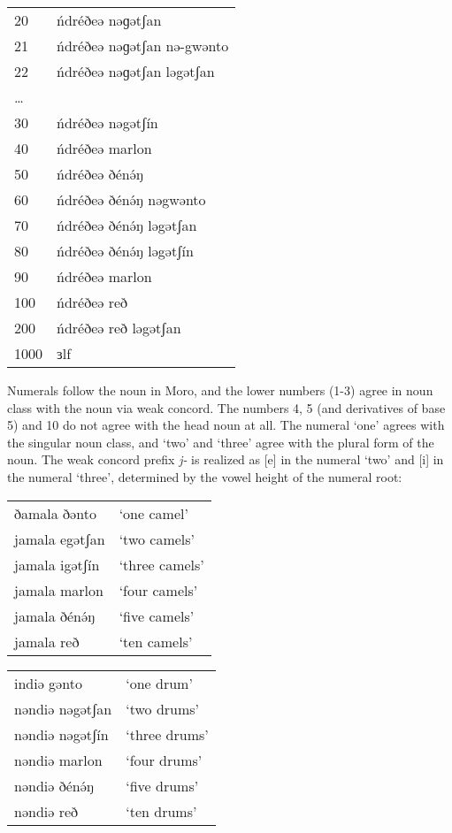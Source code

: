 \ea \begin{tabular}[t]{ll}
20	&ńdréðeə nəɡətʃan                  \\
21	&ńdréðeə nəɡətʃan nə-gwənto \\
22	& ńdréðeə nəɡətʃan ləgətʃan\\
{\ldots} & \\
30	&ńdréðeə nəgətʃín \\
40	&ńdréðeə marlon \\
50	&ńdréðeə ðénə́ŋ \\
60	&ńdréðeə ðénə́ŋ nəgwənto  \\
70	&ńdréðeə ðénə́ŋ ləgətʃan \\
80	&ńdréðeə ðénə́ŋ ləgətʃín  \\
90	&ńdréðeə marlon \\
100	&ńdréðeə reð   \\
200	&ńdréðeə reð ləgətʃan   \\
1000 & 	ɜlf \\
    \end{tabular}
\z

Numerals follow the noun in Moro, and the lower numbers (1-3) agree in noun class with the noun via weak concord. The numbers 4, 5 (and derivatives of base 5) and 10 do not agree with the head noun at all. The numeral ‘one’ agrees with the singular noun class, and ‘two’ and ‘three’ agree with the plural form of the noun. The weak concord prefix \textit{j-} is realized as [e] in the numeral ‘two’ and [i] in the numeral ‘three’, determined by the vowel height of the numeral root: 

\ea \ea \begin{tabular}[t]{ll}
ðamala ðənto	&	‘one camel’\\
jamala egətʃan	&	‘two camels’\\
jamala igətʃín	&	‘three camels’\\
jamala marlon	&	‘four camels’\\
jamala ðénə́ŋ	&	‘five camels’\\
jamala reð 		&	‘ten camels’ \\
\end{tabular}
	\ex \begin{tabular}[t]{ll}
indiə gənto		&	‘one drum’	\\
nəndiə nəgətʃan	&	‘two drums’\\
nəndiə nəgətʃín	&	‘three drums’\\
nəndiə marlon	&	‘four drums’\\
nəndiə ðénə́ŋ	&	‘five drums’\\
nəndiə reð 		& 	‘ten drums’  	\\
 \end{tabular}
	\z
\z

